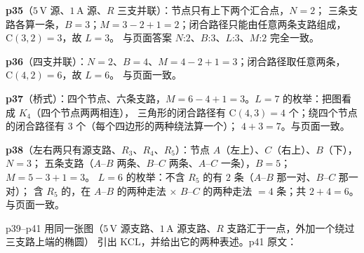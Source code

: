 \documentclass[11pt]{ctexart}
\begin{document}



\textbf{p35}（$5\,\mathrm{V}$ 源、$1\,\mathrm{A}$ 源、$R$ 三支并联）：节点只有上下两个汇合点，$N=2$；
三条支路各算一条，$B=3$；$M=3-2+1=2$；闭合路径只能由任意两条支路组成，$\mathrm{C}(3,2)=3$，故 $L=3$。
与页面答案 $N$:$2$、$B$:$3$、$L$:$3$、$M$:$2$ 完全一致。

\textbf{p36}（四支并联）：$N=2$、$B=4$、$M=4-2+1=3$；闭合路径取任意两条，$\mathrm{C}(4,2)=6$，故 $L=6$。
与页面一致。

\textbf{p37}（桥式）：四个节点、六条支路，$M=6-4+1=3$。$L=7$ 的枚举：把图看成 $K_4$（四个节点两两相连），
三角形的闭合路径有 $\mathrm{C}(4,3)=4$ 个；绕四个节点的闭合路径有 $3$ 个（每个四边形的两种绕法算一个）；
$4+3=7$。与页面一致。

\textbf{p38}（左右两只有源支路、$R_3$、$R_4$、$R_5$）：节点 $A$（左上）、$C$（右上）、$B$（下），$N=3$；
五条支路（$A$--$B$ 两条、$B$--$C$ 两条、$A$--$C$ 一条），$B=5$；$M=5-3+1=3$。
$L=6$ 的枚举：不含 $R_5$ 的有 $2$ 条（$A$--$B$ 那一对、$B$--$C$ 那一对）；
含 $R_5$ 的，在 $A$--$B$ 的两种走法 $×$ $B$--$C$ 的两种走法 $=4$ 条；共 $2+4=6$。与页面一致。



p39--p41 用同一张图（$5\,\mathrm{V}$ 源支路、$1\,\mathrm{A}$ 源支路、$R$ 支路汇于一点，外加一个绕过三支路上端的椭圆）
引出 KCL，并给出它的两种表述。p41 原文：
\end{document}
